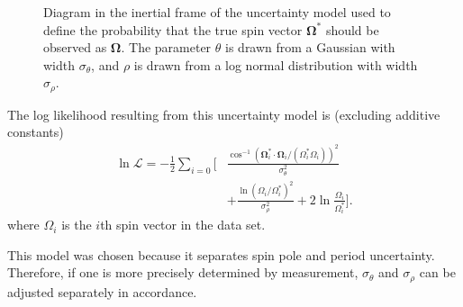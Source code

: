 \documentclass[fleqn,usenatbib]{mnras}
\newcommand{\unit}[1]{\bm{\hat{#1}}}
\newcommand{\parens}[1]{\left( #1 \right)}
\begin{document}
\begin{figure}
  \centering
  \caption{Diagram in the inertial frame of the uncertainty model used to define the probability that the true spin vector $\bm \Omega^*$ should be observed as $\bm \Omega$. The parameter $\theta$ is drawn from a Gaussian with width $\sigma_\theta$, and $\rho$ is drawn from a log normal distribution with width $\sigma_\rho$.}
  \label{fig:uncertainty-model}
\end{figure}

The log likelihood resulting from this uncertainty model is (excluding additive constants)
\begin{equation}
  \begin{split}
  \ln \mathcal{L} = -\frac{1}{2}\sum_{i = 0}\Bigg[&\frac{\cos^{-1} (\bm \Omega_i^* \cdot \bm \Omega_i/(\Omega_i^* \Omega_i))^2}{\sigma_\theta^2}\\
  &+\frac{\ln \parens{\Omega_i /\Omega_i^*}^2}{\sigma_\rho^2} + 2\ln\frac{\Omega_i}{\Omega_i^*}\Bigg].
  \end{split}
  \label{eqn:log-likelihood}
\end{equation}
where $\Omega_i$ is the $i$th spin vector in the data set.

This model was chosen because it separates spin pole and period uncertainty. Therefore, if one is more precisely determined by measurement, $\sigma_\theta$ and $\sigma_\rho$ can be adjusted separately in accordance.
\end{document}
